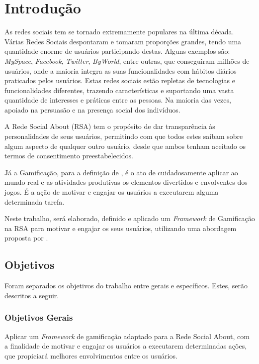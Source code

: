 \chapter[Introdução]{Introdução}
As redes sociais tem se tornado extremamente populares na última década.
Várias
Redes Sociais despontaram e tomaram proporções grandes, tendo uma quantidade enorme de usuários
participando destas. Alguns exemplos são: \textit{MySpace}, \textit{Facebook}, \textit{Twitter},
\textit{ByWorld}, entre outras, que conseguiram milhões de usuários, onde a maioria integra
as suas funcionalidades com hábitos diários praticados pelos usuários.
Estas redes sociais estão repletas de tecnologias e funcionalidades diferentes,
trazendo características e suportando uma vasta quantidade de interesses e práticas
entre as pessoas. Na maioria das vezes, apoiado na persuasão e na presença social
dos indivíduos.

A Rede Social About (RSA) tem o propósito de dar transparência às personalidades de seus usuários, permitindo com que todos
estes saibam sobre algum aspecto de qualquer outro usuário, desde que ambos tenham aceitado os
termos de consentimento preestabelecidos.

Já a Gamificação, para a definição de \cite{chou2015actionable},  é o ato de cuidadosamente aplicar ao mundo
real e as atividades produtivas os elementos divertidos e envolventes dos jogos.
É a ação de  motivar e engajar os usuários a executarem alguma determinada
tarefa. 

Neste trabalho, será elaborado, definido e aplicado um \textit{Framework} de Gamificação na RSA 
para motivar e engajar os seus usuários, utilizando uma abordagem proposta por \cite{chou2015actionable}.


\section{Objetivos}
Foram separados os objetivos do trabalho entre gerais e específicos. Estes, serão
descritos a seguir.
\subsection{Objetivos Gerais}
Aplicar um \textit{Framework} de  gamificação adaptado para a Rede Social About,
com a finalidade de motivar e engajar os usuários a executarem determinadas
ações, que propiciará melhores envolvimentos entre os usuários.
